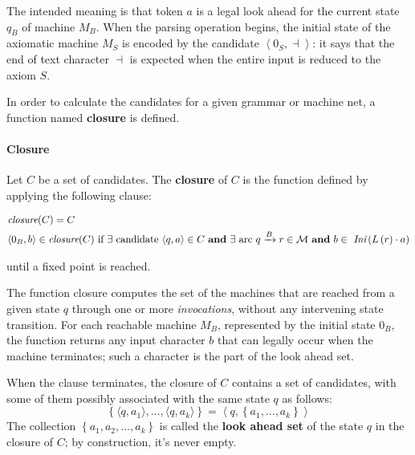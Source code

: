 \documentclass[english]{article}
\begin{document}
The intended meaning is that token \(a\) is a legal look ahead for the current state \(q_B\) of machine \(M_B\).
When the parsing operation begins, the initial state of the axiomatic machine \(M_S\) is encoded by the candidate \(\left\langle 0_S, \dashv \right\rangle\):
it says that the end of text character \(\dashv\) is expected when the entire input is reduced to the axiom \(S\).

In order to calculate the candidates for a given grammar or machine net, a function named \textbf{closure} is defined.

\paragraph{Closure}
\label{par:closure}

Let \(C\) be a set of candidates.
The \textbf{closure} of \(C\) is the function defined by applying the following clause:

\begin{gather*}
  \begin{aligned}
     & \textit{closure}(C) = C                                                                                                                                                                                                                                                 \\
     & \langle 0_B, b \rangle \in \textit{closure}(C) \ \text{if} \ \exists \ \text{candidate} \ \langle q,a \rangle \in C \ \textbf{and} \ \exists \ \text{arc} \  q\xrightarrow{B} r \in \mathcal{M} \ \textbf{and} \ b \in \ \Ini \left( L \left( r \right) \cdot a \right) \\
  \end{aligned}
\end{gather*}

until a fixed point is reached.

\bigskip
The function closure computes the set of the machines that are reached from a given state \(q\) through one or more \textit{invocations}, without any intervening state transition.
For each reachable machine \(M_B\), represented by the initial state \(0_B\), the function returns any input character \(b\) that can legally occur when the machine terminates;
such a character is the part of the look ahead set.

When the clause terminates, the closure of \(C\) contains a set of candidates, with some of them possibly associated with the same state \(q\) as follows:
\[ \left\{ \langle q, a_1 \rangle, \ldots, \langle q, a_k \rangle \right\} = \left\langle q, \left\{ a_1, \ldots, a_k \right\} \right\rangle \]
The collection \(\left\{ a_1, a_2, \ldots, a_k \right\}\) is called the \textbf{look ahead set} of the state \(q\) in the closure of \(C\);
by construction, it's never empty.
\end{document}
